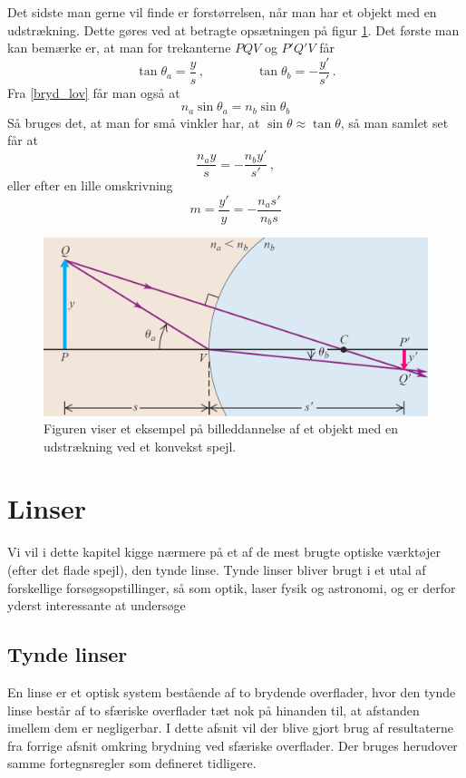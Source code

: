 Det sidste man gerne vil finde er forstørrelsen, når man har et objekt med en udstrækning. Dette gøres ved at betragte opsætningen på figur \ref{konveks_brydning2}. Det første man kan bemærke er, at man for trekanterne $PQV$ og $P'Q'V$ får
$$\tan \theta_a = \frac{y}{s} \, , \quad \quad \quad \quad \tan \theta_b = - \frac{y'}{s'} \, .$$
Fra \eqref{bryd_lov} får man også at
$$n_a \sin \theta_a = n_b \sin \theta_b$$
Så bruges det, at man for små vinkler har, at $\sin \theta \approx \tan \theta$, så man samlet set får at
$$\frac{n_a y}{s} = - \frac{n_b y'}{s'} \, ,$$
eller efter en lille omskrivning
\begin{equation}
m = \frac{y'}{y} = - \frac{n_a s'}{n_b s}
\end{equation}

\begin{figure}[h!]
	\centering
	\includegraphics[scale=0.26]{Geometrisk-Optik/konveks_brydning2.PNG}
	\caption{Figuren viser et eksempel på billeddannelse af et objekt med en udstrækning ved et konvekst spejl.}
	\label{konveks_brydning2}
\end{figure} 

\section{Linser}
Vi vil i dette kapitel kigge nærmere på et af de mest brugte optiske værktøjer (efter det flade spejl), den tynde linse. Tynde linser bliver brugt i et utal af forskellige forsøgsopstillinger, så som optik, laser fysik og astronomi, og er derfor yderst interessante at undersøge

\subsection{Tynde linser}

En linse er et optisk system bestående af to brydende overflader, hvor den tynde linse består af to sfæriske overflader tæt nok på hinanden til, at afstanden imellem dem er negligerbar. I dette afsnit vil der blive gjort brug af resultaterne fra forrige afsnit omkring brydning ved sfæriske overflader. Der bruges herudover samme fortegnsregler som defineret tidligere. \\

